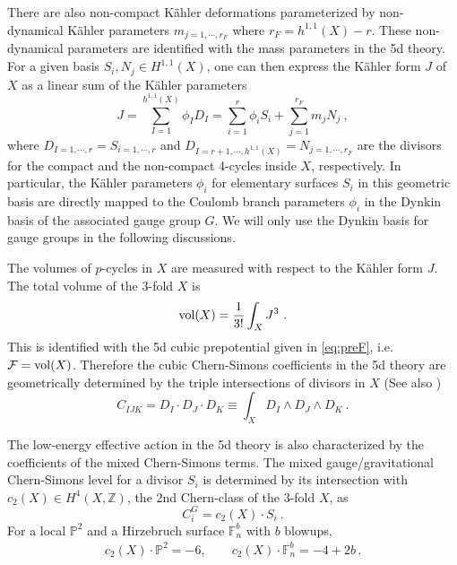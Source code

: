 There are also non-compact K\"ahler deformations parameterized by non-dynamical K\"ahler parameters $m_{j=1,\cdots,r_F}$ where $r_F=h^{1,1}(X)-r$. These non-dynamical parameters are identified with the mass parameters in the 5d theory. For a given basis $S_i,N_j \in H^{1,1}(X)$, one can then express the K\"ahler form $J$ of $X$ as a linear sum of the K\"ahler parameters
\begin{equation}
	J = \sum_{I=1}^{h^{1,1}(X)}\phi_I D_I= \sum_{i=1}^r\phi_i S_i + \sum_{j=1}^{r_F} m_j N_j \ ,
\end{equation}
where $D_{I=1,\cdots,r}=S_{i=1,\cdots,r}$ and $D_{I=r+1,\cdots, h^{1,1}(X) }=N_{j=1,\cdots,r_F}$ are the divisors for the compact and the non-compact 4-cycles inside $X$, respectively. In particular, the K\"ahler parameters $\phi_i$ for elementary surfaces $S_i$ in this geometric basis are directly mapped to the Coulomb branch parameters $\phi_i$ in the Dynkin basis of the associated gauge group $G$. We will only use the Dynkin basis for gauge groups in the following discussions.

The volumes of $p$-cycles in $X$ are measured with respect to the K\"ahler form $J$. The total volume of the 3-fold $X$ is 
\begin{equation}
	{\rm vol}(X) = \frac{1}{3!}\int_X J^3  \ .
\end{equation}
This is identified with the 5d cubic prepotential given in \eqref{eq:preF}, i.e. $\mathcal{F}={\rm vol}(X)$. Therefore the cubic Chern-Simons coefficients in the 5d theory are geometrically determined by the triple intersections of divisors in $X$ \cite{Cadavid:1995bk,Ferrara:1996hh,Witten:1996qb,Ferrara:1996wv} (See also \cite{Grimm:2011fx,Bonetti:2011mw,Bonetti:2013ela})
\begin{equation}
	C_{IJK} = D_I\cdot D_J\cdot D_K \equiv \int_X D_I\wedge D_J\wedge D_K \ .
\end{equation}

The low-energy effective action in the 5d theory is also characterized by the coefficients of the mixed Chern-Simons terms. The mixed gauge/gravitational Chern-Simons level for a divisor $S_i$ is determined by its intersection with $c_2(X)\in H^4(X,\mathbb{Z})$, the 2nd Chern-class of the 3-fold $X$, as \cite{Cadavid:1995bk,Ferrara:1996hh,Bonetti:2011mw,Bonetti:2013ela,Katz:2020ewz}
\begin{equation}
	C_i^G = c_2(X)\cdot S_i \ .\label{eq:C_i}
\end{equation}
For a local $\mathbb{P}^2$ and a Hirzebruch surface $\mathbb{F}_n^{b}$ with $b$ blowups,
\begin{align}
	c_2(X)\cdot \mathbb{P}^2 = -6, \qquad c_2(X)\cdot \mathbb{F}_n^{b} = -4+2b \, .
\end{align}

